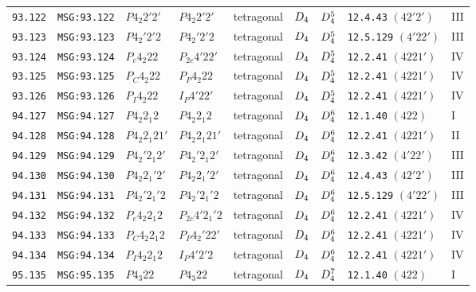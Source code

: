 \documentclass[fleqn,10pt]{jsarticle}
\begin{document}
\begin{center}
\begin{longtable}{lllllllll}
\texttt{93.122} & \texttt{MSG:93.122} & $P4_{2}2'2'$ & $P4_{2}2'2'$ & tetragonal & $D_{\rm 4}$ & $D_{\rm 4}^{5}$ & \texttt{12.4.43} $(42'2')$ & III \\
\texttt{93.123} & \texttt{MSG:93.123} & $P4_{2}'2'2$ & $P4_{2}'2'2$ & tetragonal & $D_{\rm 4}$ & $D_{\rm 4}^{5}$ & \texttt{12.5.129} $(4'22')$ & III \\
\texttt{93.124} & \texttt{MSG:93.124} & $P_{c}4_{2}22$ & $P_{2c}4'22'$ & tetragonal & $D_{\rm 4}$ & $D_{\rm 4}^{5}$ & \texttt{12.2.41} $(4221')$ & IV \\
\texttt{93.125} & \texttt{MSG:93.125} & $P_{C}4_{2}22$ & $P_{P}4_{2}22$ & tetragonal & $D_{\rm 4}$ & $D_{\rm 4}^{5}$ & \texttt{12.2.41} $(4221')$ & IV \\
\texttt{93.126} & \texttt{MSG:93.126} & $P_{I}4_{2}22$ & $I_{P}4'22'$ & tetragonal & $D_{\rm 4}$ & $D_{\rm 4}^{5}$ & \texttt{12.2.41} $(4221')$ & IV \\ \hline
\texttt{94.127} & \texttt{MSG:94.127} & $P4_{2}2_{1}2$ & $P4_{2}2_{1}2$ & tetragonal & $D_{\rm 4}$ & $D_{\rm 4}^{6}$ & \texttt{12.1.40} $(422)$ & I \\
\texttt{94.128} & \texttt{MSG:94.128} & $P4_{2}2_{1}21'$ & $P4_{2}2_{1}21'$ & tetragonal & $D_{\rm 4}$ & $D_{\rm 4}^{6}$ & \texttt{12.2.41} $(4221')$ & II \\
\texttt{94.129} & \texttt{MSG:94.129} & $P4_{2}'2_{1}2'$ & $P4_{2}'2_{1}2'$ & tetragonal & $D_{\rm 4}$ & $D_{\rm 4}^{6}$ & \texttt{12.3.42} $(4'22')$ & III \\
\texttt{94.130} & \texttt{MSG:94.130} & $P4_{2}2_{1}'2'$ & $P4_{2}2_{1}'2'$ & tetragonal & $D_{\rm 4}$ & $D_{\rm 4}^{6}$ & \texttt{12.4.43} $(42'2')$ & III \\
\texttt{94.131} & \texttt{MSG:94.131} & $P4_{2}'2_{1}'2$ & $P4_{2}'2_{1}'2$ & tetragonal & $D_{\rm 4}$ & $D_{\rm 4}^{6}$ & \texttt{12.5.129} $(4'22')$ & III \\
\texttt{94.132} & \texttt{MSG:94.132} & $P_{c}4_{2}2_{1}2$ & $P_{2c}4'2_{1}'2$ & tetragonal & $D_{\rm 4}$ & $D_{\rm 4}^{6}$ & \texttt{12.2.41} $(4221')$ & IV \\
\texttt{94.133} & \texttt{MSG:94.133} & $P_{C}4_{2}2_{1}2$ & $P_{P}4_{2}'22'$ & tetragonal & $D_{\rm 4}$ & $D_{\rm 4}^{6}$ & \texttt{12.2.41} $(4221')$ & IV \\
\texttt{94.134} & \texttt{MSG:94.134} & $P_{I}4_{2}2_{1}2$ & $I_{P}4'2'2$ & tetragonal & $D_{\rm 4}$ & $D_{\rm 4}^{6}$ & \texttt{12.2.41} $(4221')$ & IV \\ \hline
\texttt{95.135} & \texttt{MSG:95.135} & $P4_{3}22$ & $P4_{3}22$ & tetragonal & $D_{\rm 4}$ & $D_{\rm 4}^{7}$ & \texttt{12.1.40} $(422)$ & I \\

\end{longtable}
\end{center}
\end{document}
